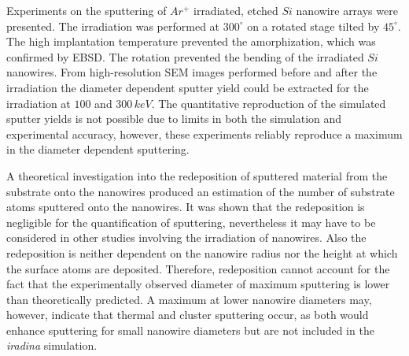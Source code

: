 Experiments on the sputtering of $Ar^+$ irradiated, etched $Si$ nanowire arrays were presented. The irradiation was performed at $300^\circ$ on a rotated stage tilted by $45^\circ$. The high implantation temperature prevented the amorphization, which was confirmed by EBSD. The rotation prevented the bending of the irradiated $Si$ nanowires. From high-resolution SEM images performed before and after the irradiation the diameter dependent sputter yield could be extracted for the irradiation at $100$ and $300\,keV$. The quantitative reproduction of the simulated sputter yields is not possible due to limits in both the simulation and experimental accuracy, however, these experiments reliably reproduce a maximum in the diameter dependent sputtering. 

A theoretical investigation into the redeposition of sputtered material from the substrate onto the nanowires produced an estimation of the number of substrate atoms sputtered onto the nanowires. It was shown that the redeposition is negligible for the quantification of sputtering, nevertheless it may have to be considered in other studies involving the irradiation of nanowires. Also the redeposition is neither dependent on the nanowire radius nor the height at which the surface atoms are deposited. Therefore, redeposition cannot account for the fact that the experimentally observed diameter of maximum sputtering is lower than theoretically predicted. A maximum at lower nanowire diameters may, however, indicate that thermal and cluster sputtering occur, as both would enhance sputtering for small nanowire diameters but are not included in the \emph{iradina} simulation.

